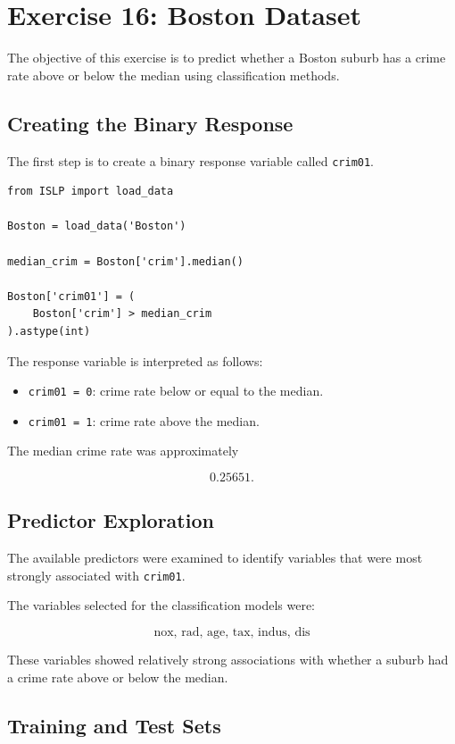 \documentclass[12pt,a4paper]{article}
\begin{document}
\section{Exercise 16: Boston Dataset}

The objective of this exercise is to predict whether a Boston suburb has a
crime rate above or below the median using classification methods.

\subsection{Creating the Binary Response}

The first step is to create a binary response variable called
\texttt{crim01}.

\begin{lstlisting}
from ISLP import load_data

Boston = load_data('Boston')

median_crim = Boston['crim'].median()

Boston['crim01'] = (
    Boston['crim'] > median_crim
).astype(int)
\end{lstlisting}

The response variable is interpreted as follows:

\begin{itemize}
    \item \texttt{crim01 = 0}: crime rate below or equal to the median.
    \item \texttt{crim01 = 1}: crime rate above the median.
\end{itemize}

The median crime rate was approximately

\[
\boxed{0.25651}.
\]

\subsection{Predictor Exploration}

The available predictors were examined to identify variables that were most
strongly associated with \texttt{crim01}.

The variables selected for the classification models were:

\[
\boxed{
\text{nox, rad, age, tax, indus, dis}
}
\]

These variables showed relatively strong associations with whether a suburb
had a crime rate above or below the median.

\subsection{Training and Test Sets}
\end{document}
